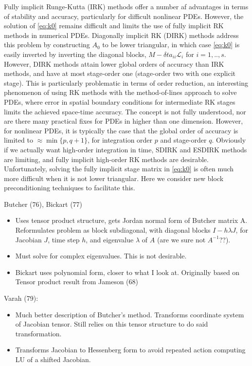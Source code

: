 \documentclass[a4paper,10pt]{article}
\begin{document}
Fully implicit Runge-Kutta (IRK) methods offer a number af advantages in terms of stability and
accuracy, particularly for difficult nonlinear PDEs. However, the solution of \eqref{eq:k0}
remains difficult and limits the use of fully implicit RK methods in numerical PDEs.
Diagonally implicit RK (DIRK) methods address this problem by constructing $A_0$ to be lower
triangular, in which case \eqref{eq:k0} is easily inverted by inverting the diagonal
blocks, $M - \delta ta_{ii}\mathcal{L}_i$ for $i=1,..,s$. However, DIRK methods attain
lower global orders of accuracy than IRK methods, and have at most stage-order one (stage-order
two with one explicit stage). This is particularly problematic in terms of order reduction,
an interesting phenomenon of using RK methods with the method-of-lines approach to solve PDEs,
where error in spatial boundary conditions for intermediate RK stages limits the achieved space-time
accuracy. The concept is not fully understood, nor are there many practical fixes for PDEs
in higher than one dimension. However, for nonlinear PDEs, it is typically the case that the global 
order of accuracy is limited to $\approx \min\{ p, q+1\}$, for integration order $p$ and stage-order
$q$. Obviously if we actually want high-order integration in time, SDIRK and ESDIRK methods
are limiting, and fully implicit high-order RK methods are desirable. Unfortunately, solving the
fully implicit stage matrix in \eqref{eq:k0} is often much more difficult when it is not lower triangular.
Here we consider new block preconditioning techniques to facilitate this.

Butcher (76), Bickart (77)
\begin{itemize}
	\item Uses tensor product structure, gets Jordan normal form of Butcher matrix A. Reformulates
	problem as block subdiagonal, with diagonal blocks $I - h\lambda J$, for Jacobian $J$, time step $h$,
	and eigenvalue $\lambda$ of $A$ (are we sure not $A^{-1}$??).
	\item Must solve for complex eigenvalues. This is not desirable. 
	\item Bickart uses polynomial form, closer to what I look at. Originally based on Tensor product
	result from Jameson (68)
\end{itemize}

Varah (79):
\begin{itemize}
	\item Much better description of Butcher's method. Transforms coordinate system of Jacobian tensor.
	Still relies on this tensor structure to do said transformation. 
	\item Transforms Jacobian to Hessenberg form to avoid repeated action computing LU of a shifted 
	Jacobian.
\end{itemize}
\end{document}
